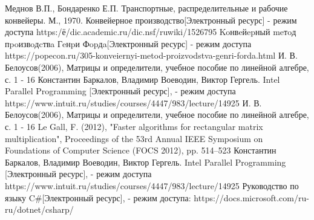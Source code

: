 \documentclass[12pt]{report}
\begin{document}
 \begin{thebibliography}{3}
 Меднов В.П., Бондаренко Е.П. Транспортные, распределительные и рабочие конвейеры. М., 1970.
 Конвейерное производство[Электронный ресурс] - режим доступа https:/ё/dic.academic.ru/dic.nsf/ruwiki/1526795
 Koнвeйepный meтoд пpoизвoдcтвa Гeнpи Фopдa[Электронный ресурс] - режим доступа https://popecon.ru/305-konveiernyi-metod-proizvodstva-genri-forda.html
 И. В. Белоусов(2006), Матрицы и определители, учебное пособие по линейной алгебре, с. 1 - 16
 Константин Баркалов, Владимир Воеводин, Виктор Гергель. Intel Parallel Programming [Электронный ресурс], - режим доступа https://www.intuit.ru/studies/courses/4447/983/lecture/14925
И. В. Белоусов(2006), Матрицы и определители, учебное пособие по линейной алгебре, с. 1 - 16
Le Gall, F. (2012), "Faster algorithms for rectangular matrix multiplication", Proceedings of the 53rd Annual IEEE Symposium on Foundations of Computer Science (FOCS 2012), pp. 514–523
Константин Баркалов, Владимир Воеводин, Виктор Гергель. Intel Parallel Programming [Электронный ресурс], - режим доступа https://www.intuit.ru/studies/courses/4447/983/lecture/14925
Руководство по языку C\#[Электронный ресурс], - режим доступа: https://docs.microsoft.com/ru-ru/dotnet/csharp/
\end{thebibliography}
\end{document}
